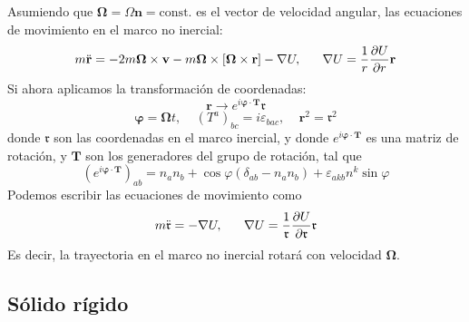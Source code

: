 \documentclass[]{article}
\numberwithin{equation}{section}
\begin{document}
Asumiendo que \(\mathbf{\Omega} = \Omega\mathbf{n} = \mathrm{const.}\) es el vector de velocidad angular, las ecuaciones de movimiento en el marco no inercial:
\begin{equation*}
	m \ddot{\mathbf{r}} = -2m\mathbf{\Omega}\times\mathbf{v} - m\mathbf{\Omega}\times\left[\mathbf{\Omega}\times\mathbf{r}\right] - \nabla U, ~~~~~\nabla U = \frac{1}{r}\dfrac{\partial U}{\partial r}\mathbf{r}
\end{equation*}
Si ahora aplicamos la transformación de coordenadas:
\begin{equation}
	\mathbf{r} \rightarrow e^{i\mathbf{\varphi}\cdot\mathbf{T}} \mathbf{\mathfrak{r}}
\end{equation}
\begin{equation*}
	\mathbf{\varphi} = \mathbf{\Omega} t, ~~~~~(T^{a})_{bc} = i \varepsilon_{bac}, ~~~~~\mathbf{r}^2 = \mathbf{\mathfrak{r}}^2
\end{equation*}
donde \(\mathbf{\mathfrak{r}}\) son las coordenadas en el marco inercial, y donde \(e^{i\mathbf{\varphi}\cdot\mathbf{T}}\) es una matriz de rotación, y \(\mathbf{T}\) son los generadores del grupo de rotación, tal que
\begin{equation}
	\left(e^{i\mathbf{\varphi}\cdot\mathbf{T}} \right)_{ab} = n_a n_b + \cos\varphi(\delta_{ab} - n_a n_b) + \varepsilon_{akb} n^k \sin\varphi
\end{equation}
Podemos escribir las ecuaciones de movimiento como
\begin{equation}
	m \ddot{\mathbf{\mathfrak{r}}} = -\nabla U, ~~~~~\nabla U = \frac{1}{\mathfrak{r}}\dfrac{\partial U}{\partial \mathfrak{r}}\mathbf{\mathfrak{r}}
\end{equation}
Es decir, la trayectoria en el marco no inercial rotará con velocidad \(\mathbf{\Omega}\).

\subsection{Sólido rígido}
\end{document}
